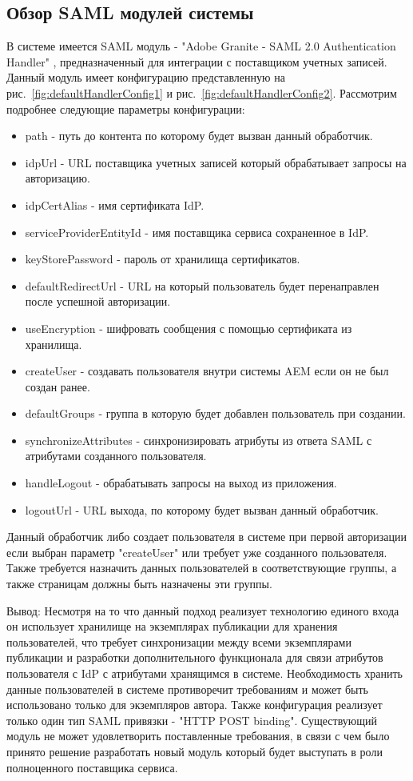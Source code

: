 \subsection{Обзор SAML модулей системы}
В системе имеется SAML модуль - "Adobe Granite - SAML 2.0 Authentication Handler" \cite{web:aemSaml}, предназначенный для интеграции с поставщиком учетных записей. Данный модуль имеет конфигурацию представленную на рис.~\ref{fig:defaultHandlerConfig1} и рис.~\ref{fig:defaultHandlerConfig2}. Рассмотрим подробнее следующие параметры конфигурации:
\begin{itemize}
\item path - путь до контента по которому будет вызван данный обработчик.
\item idpUrl - URL поставщика учетных записей который обрабатывает запросы на авторизацию.
\item idpCertAlias - имя сертификата IdP.
\item serviceProviderEntityId - имя поставщика сервиса сохраненное в IdP.
\item keyStorePassword - пароль от хранилища сертификатов.
\item defaultRedirectUrl - URL на который пользователь будет перенаправлен после успешной авторизации.
\item useEncryption - шифровать сообщения с помощью сертификата из хранилища.
\item createUser - создавать пользователя внутри системы AEM если он не был создан ранее.
\item defaultGroups - группа в которую будет добавлен пользователь при создании.
\item synchronizeAttributes - синхронизировать атрибуты из ответа SAML с атрибутами созданного пользователя.
\item handleLogout - обрабатывать запросы на выход из приложения.
\item logoutUrl - URL выхода, по которому будет вызван данный обработчик.
\end{itemize}

Данный обработчик либо создает пользователя в системе при первой авторизации если выбран параметр "createUser" или требует уже созданного пользователя. Также требуется назначить данных пользователей в соответствующие группы, а также страницам должны быть назначены эти группы. 

Вывод: Несмотря на то что данный подход реализует технологию единого входа он использует хранилище на экземплярах публикации для хранения пользователей, что требует синхронизации между всеми экземплярами публикации и разработки дополнительного функционала для связи атрибутов пользователя с IdP с атрибутами  хранящимся в системе. Необходимость хранить данные пользователей в системе противоречит требованиям и может быть использовано только для экземпляров автора. Также конфигурация реализует только один тип SAML привязки - "HTTP POST binding". Существующий модуль не может удовлетворить поставленные требования, в связи с чем было принято решение разработать новый модуль который будет выступать в роли полноценного поставщика сервиса.

